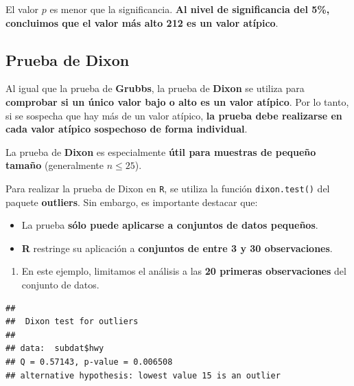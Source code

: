 \documentclass[
]{book}
\newenvironment{Shaded}{\begin{snugshade}}{\end{snugshade}}
\newcommand{\DecValTok}[1]{\textcolor[rgb]{0.00,0.00,0.81}{#1}}
\newcommand{\FunctionTok}[1]{\textcolor[rgb]{0.13,0.29,0.53}{\textbf{#1}}}
\newcommand{\NormalTok}[1]{#1}
\newcommand{\OtherTok}[1]{\textcolor[rgb]{0.56,0.35,0.01}{#1}}
\newcommand{\SpecialCharTok}[1]{\textcolor[rgb]{0.81,0.36,0.00}{\textbf{#1}}}
\providecommand{\tightlist}{%
  \setlength{\itemsep}{0pt}\setlength{\parskip}{0pt}}
\begin{document}
El valor \(p\) es menor que la significancia. \textbf{Al nivel de significancia del 5\%, concluimos que el valor más alto 212 es un valor atípico}.

\subsection{Prueba de Dixon}\label{prueba-de-dixon}

Al igual que la prueba de \textbf{Grubbs}, la prueba de \textbf{Dixon} se utiliza para \textbf{comprobar si un único valor bajo o alto es un valor atípico}. Por lo tanto, si se sospecha que hay más de un valor atípico, \textbf{la prueba debe realizarse en cada valor atípico sospechoso de forma individual}.

La prueba de \textbf{Dixon} es especialmente \textbf{útil para muestras de pequeño tamaño} (generalmente \(n \leq 25\)).

Para realizar la prueba de Dixon en \texttt{R}, se utiliza la función \texttt{dixon.test()} del paquete \textbf{outliers}. Sin embargo, es importante destacar que:

\begin{itemize}
\tightlist
\item
  La prueba \textbf{sólo puede aplicarse a conjuntos de datos pequeños}.\\
\item
  \textbf{R} restringe su aplicación a \textbf{conjuntos de entre 3 y 30 observaciones}.
\end{itemize}

\begin{enumerate}
\def\labelenumi{\arabic{enumi}.}
\tightlist
\item
  En este ejemplo, limitamos el análisis a las \textbf{20 primeras observaciones} del conjunto de datos.
\end{enumerate}

\begin{Shaded}
\end{Shaded}

\begin{verbatim}
## 
##  Dixon test for outliers
## 
## data:  subdat$hwy
## Q = 0.57143, p-value = 0.006508
## alternative hypothesis: lowest value 15 is an outlier
\end{verbatim}
\end{document}
